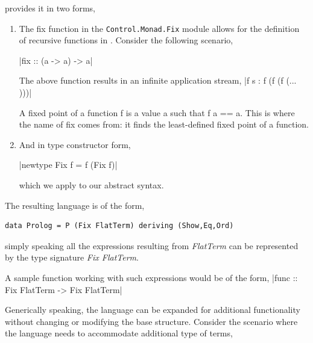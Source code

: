 \documentclass[thesis-solanki.tex]{subfiles}
\begin{document}
 provides it in two forms,
\begin{enumerate}

\item The fix function in the \texttt{Control.Monad.Fix} module allows for the definition of recursive functions in . Consider the following scenario,

|fix :: (a -> a) -> a|

The above function results in an infinite application stream,
|f s : f (f (f (... )))|

A fixed point of a function f is a value a such that f a == a. This is where the name of fix comes from: it finds the least-defined fixed
point of a function.

\item And in type constructor form,

|newtype Fix f = f (Fix f)|

which we apply to our abstract syntax.

\end{enumerate}


The resulting language is of the form,
\begin{verbatim}
data Prolog = P (Fix FlatTerm) deriving (Show,Eq,Ord)
\end{verbatim}
%
simply speaking all the expressions resulting from \textit{FlatTerm} can be represented  by the type signature \textit{Fix FlatTerm}.

A sample function working with such expressions would be of the form,
|func :: Fix FlatTerm -> Fix FlatTerm|


Generically speaking, the language can be expanded for additional functionality without changing or modifying the base structure. Consider
the scenario where the language needs to accommodate additional type of terms,
\end{document}
